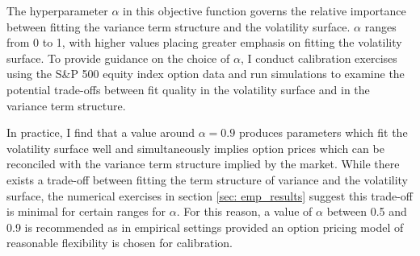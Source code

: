 \documentclass[12pt]{article}
\begin{document}
The hyperparameter $\alpha$ in this objective function governs the relative importance between fitting the variance term structure and the volatility surface. $\alpha$ ranges from 0 to 1, with higher values placing greater emphasis on fitting the volatility surface. To provide guidance on the choice of $\alpha$, I conduct calibration exercises using the S\&P 500 equity index option data and run simulations to examine the potential trade-offs between fit quality in the volatility surface and in the variance term structure. 

In practice, I find that a value around $\alpha = 0.9$ produces parameters which fit the volatility surface well and simultaneously implies option prices which can be reconciled with the variance term structure implied by the market. While there exists a trade-off between fitting the term structure of variance and the volatility surface, the numerical exercises in section \ref{sec: emp_results} suggest this trade-off is minimal for certain ranges for $\alpha$. For this reason, a value of $\alpha$ between 0.5 and 0.9 is recommended as in empirical settings provided an option pricing model of reasonable flexibility is chosen for calibration. 
\end{document}
